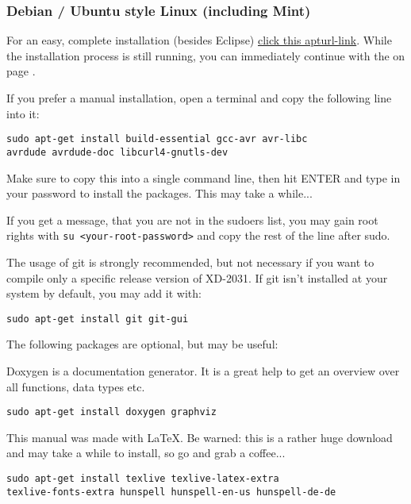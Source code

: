 \subsubsection{Debian / Ubuntu style Linux (including Mint)}
For an easy, complete installation (besides Eclipse) 
\href{apt://build-essential,gcc-avr,avr-libc,avrdude,avrdude-doc,libcurl4-gnutls-dev,git,git-gui,doxygen,graphviz,texlive,texlive-latex-extra,texlive-fonts-extra,hunspell,hunspell-en-us,hunspell-de-de}{click this apturl-link}.
While the installation process is still running, you can immediately 
continue with the 
 on page \pageref{eclipseinst}.

If you prefer a manual installation, open a terminal and copy the following line into it:

\begin{verbatim}
sudo apt-get install build-essential gcc-avr avr-libc 
avrdude avrdude-doc libcurl4-gnutls-dev
\end{verbatim}

Make sure to copy this into a single command line, then hit ENTER 
and type in your password to install the packages. 
This may take a while...  

If you get a message, that you are not in the 
sudoers list, you may gain root rights with \texttt{su <your-root-password>} 
and copy the rest of the line after sudo.

The usage of git is strongly recommended, but not necessary if you want to
compile only a specific release version of XD-2031. If git isn't installed
at your system by default, you may add it with:

\begin{verbatim}
sudo apt-get install git git-gui
\end{verbatim}

The following packages are optional, but may be useful: 

Doxygen is a
documentation generator. It is a great help to get an overview over all
functions, data types etc. 

\begin{verbatim}
sudo apt-get install doxygen graphviz
\end{verbatim}

This manual was made with \LaTeX{}. Be warned: this is a rather huge
download and may take a while to install, so go and grab a coffee...

\begin{verbatim}
sudo apt-get install texlive texlive-latex-extra 
texlive-fonts-extra hunspell hunspell-en-us hunspell-de-de
\end{verbatim}


